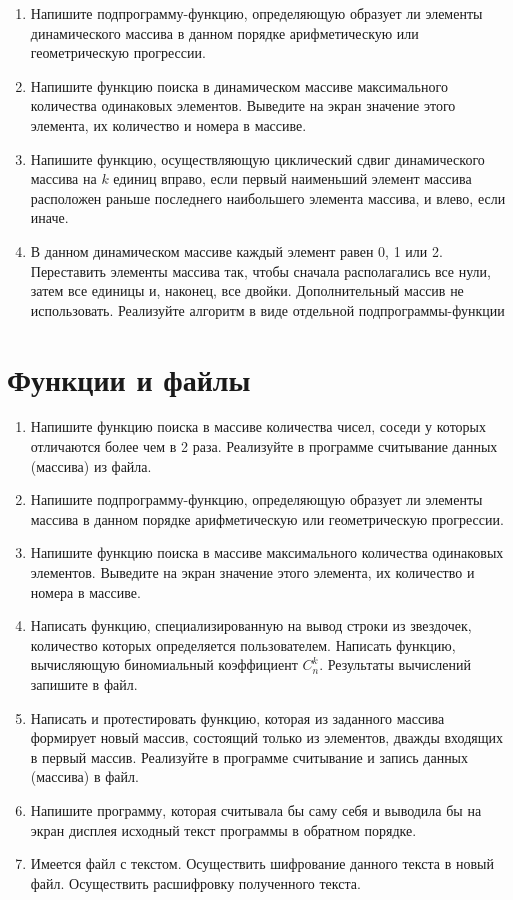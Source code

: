 \begin{enumerate}[leftmargin=*]
    \item Напишите подпрограмму-функцию, определяющую образует ли элементы динамического массива в данном порядке арифметическую или геометрическую прогрессии.
    \item Напишите функцию поиска в динамическом массиве максимального количества одинаковых элементов. Выведите на экран значение этого элемента, их количество и номера в массиве.
    \item Напишите функцию, осуществляющую циклический сдвиг динамического массива на $k$ единиц вправо, если первый наименьший элемент массива расположен раньше последнего наибольшего элемента массива, и влево, если иначе.
    \item В данном динамическом массиве каждый элемент равен 0, 1  или 2. Переставить элементы массива так, чтобы сначала располагались все нули, затем все единицы и, наконец, все двойки. Дополнительный массив не использовать. Реализуйте алгоритм в виде отдельной подпрограммы-функции
\end{enumerate}

\section{Функции и файлы}
\begin{enumerate}[leftmargin=*]
    \item Напишите функцию поиска в массиве количества чисел, соседи у которых отличаются более чем в 2 раза. Реализуйте в программе считывание данных (массива) из файла.
    \item Напишите подпрограмму-функцию, определяющую образует ли элементы массива в данном порядке арифметическую или геометрическую прогрессии.
    \item Напишите функцию поиска в массиве максимального количества одинаковых элементов. Выведите на экран значение этого элемента, их количество и номера в массиве.
    \item Написать функцию, специализированную на вывод строки из звездочек, количество которых определяется пользователем.
    Написать функцию, вычисляющую биномиальный коэффициент $C_n^k$. Результаты вычислений запишите в файл.
    \item Написать и протестировать функцию, которая из заданного массива формирует новый массив, состоящий только из элементов, дважды входящих в первый массив. Реализуйте в программе считывание и запись данных (массива) в файл.
    \item Напишите программу, которая считывала бы саму себя и выводила бы на экран дисплея исходный текст программы в обратном порядке.
    \item Имеется файл с текстом. Осуществить шифрование данного текста в новый файл. Осуществить расшифровку полученного текста.
\end{enumerate}